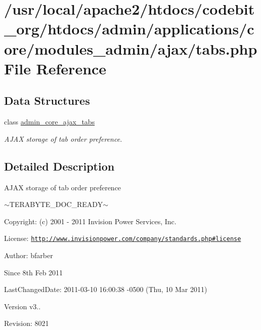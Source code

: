 \hypertarget{tabs_8php}{\section{/usr/local/apache2/htdocs/codebit\-\_\-org/htdocs/admin/applications/core/modules\-\_\-admin/ajax/tabs.php File Reference}
\label{tabs_8php}
}
\subsection*{Data Structures}
\begin{DoxyCompactItemize}
\item 
class \hyperlink{classadmin__core__ajax__tabs}{admin\-\_\-core\-\_\-ajax\-\_\-tabs}
\begin{DoxyCompactList}\small\item\em A\-J\-A\-X storage of tab order preference. \end{DoxyCompactList}\end{DoxyCompactItemize}


\subsection{Detailed Description}
\begin{DoxyVerb}  AJAX storage of tab order preference
\end{DoxyVerb}
 $\sim$\-T\-E\-R\-A\-B\-Y\-T\-E\-\_\-\-D\-O\-C\-\_\-\-R\-E\-A\-D\-Y$\sim$ \begin{DoxyParagraph}{Copyright\-:}
(c) 2001 -\/ 2011 Invision Power Services, Inc.
\end{DoxyParagraph}
\begin{DoxyParagraph}{License\-:}
\href{http://www.invisionpower.com/company/standards.php#license}{\tt http\-://www.\-invisionpower.\-com/company/standards.\-php\#license}
\end{DoxyParagraph}
\begin{DoxyParagraph}{Author\-:}
bfarber 
\end{DoxyParagraph}
\begin{DoxySince}{Since}
8th Feb 2011 
\end{DoxySince}
\begin{DoxyParagraph}{Last\-Changed\-Date\-:}
2011-\/03-\/10 16\-:00\-:38 -\/0500 (Thu, 10 Mar 2011) 
\end{DoxyParagraph}
\begin{DoxyVersion}{Version}
v3.. 
\end{DoxyVersion}
\begin{DoxyParagraph}{Revision\-:}
8021 
\end{DoxyParagraph}
